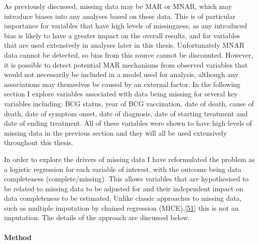 \documentclass[11pt,twoside]{bristolthesis}
\begin{document}
  As previously discussed, missing data may be MAR or MNAR, which may introduce biases into any analyses based on these data. This is of particular importance for variables that have high levels of missingness, as any introduced bias is likely to have a greater impact on the overall results, and for variables that are used extensively in analyses later in this thesis. Unfortunately MNAR data cannot be detected, so bias from this source cannot be discounted. However, it is possible to detect potential MAR mechanisms from observed variables that would not necessarily be included in a model used for analysis, although any associations may themselves be caused by an external factor. In the following section I explore variables associated with data being missing for several key variables including: BCG status, year of BCG vaccination, date of death, cause of death, date of symptom onset, date of diagnosis, date of starting treatment and date of ending treatment. All of these variables were shown to have high levels of missing data in the previous section and they will all be used extensively throughout this thesis.
  
  In order to explore the drivers of missing data I have reformulated the problem as a logistic regression for each variable of interest, with the outcome being data completeness (complete/missing). This allows variables that are hypothesised to be related to missing data to be adjusted for and their independent impact on data completeness to be estimated. Unlike classic approaches to missing data, such as multiple imputation by chained regression (MICE),{[}\protect\hyperlink{ref-Groothuis-oudshoorn}{51}{]} this is not an imputation. The details of the approach are discussed below.
  
  \hypertarget{method}{%
  \paragraph{Method}\label{method}}
  
\end{document}
